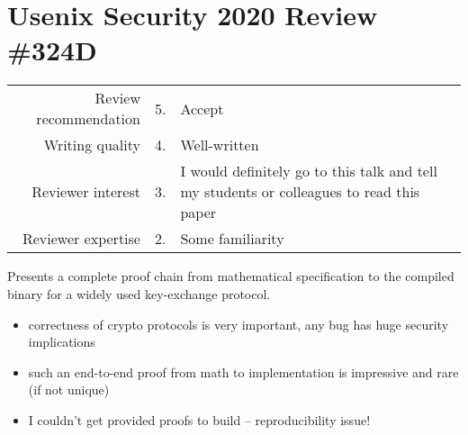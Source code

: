 \newpage
\section*{Usenix Security 2020 Review \#324D}

\begin{tabular}{rrp{}}
    \toprule
    Review recommendation & 5.& Accept                                                                \\
    Writing quality       & 4.& Well-written                                                          \\
    Reviewer interest     & 3.& I would definitely go to this talk and tell my students or colleagues to read this paper \\
    Reviewer expertise    & 2.& Some familiarity                                                      \\
    \bottomrule
\end{tabular}

\begin{center}
\end{center}
Presents a complete proof chain from mathematical specification to the compiled binary for a widely used key-exchange protocol.

\begin{center}
\end{center}

\begin{itemize}
    \item correctness of crypto protocols is very important, any bug has huge security implications
    \item such an end-to-end proof from math to implementation is impressive and rare (if not unique)
\end{itemize}


\begin{center}
\end{center}

\begin{itemize}
    \item I couldn't get provided proofs to build – reproducibility issue!
\end{itemize}

\begin{center}
\end{center}

